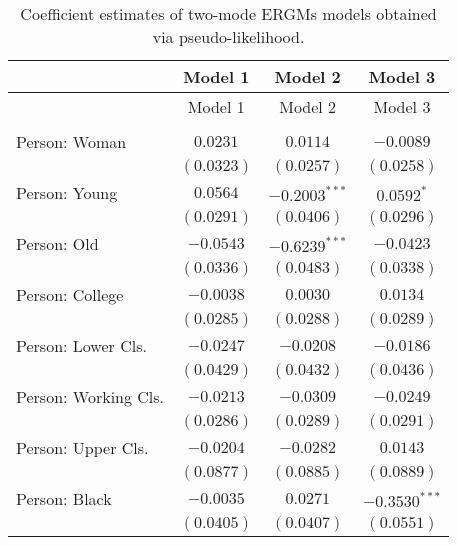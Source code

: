 
\begin{center}
\begin{longtable}{l c c c}
\caption{Coefficient estimates of two-mode ERGMs models obtained via pseudo-likelihood.}
\label{tab:reg2}\\
\toprule
 & Model 1 & Model 2 & Model 3 \\
\midrule
\endfirsthead
\toprule
 & Model 1 & Model 2 & Model 3 \\
\midrule
\endhead
\bottomrule
\endfoot
\bottomrule
\multicolumn{4}{l}{\scriptsize{$^{***}p<0.001$; $^{**}p<0.01$; $^{*}p<0.05$}}\\
\endlastfoot
Person: Woman              & $0.0231$       & $0.0114$        & $-0.0089$       \\
                           & $(0.0323)$     & $(0.0257)$      & $(0.0258)$      \\
Person: Young              & $0.0564$       & $-0.2003^{***}$ & $0.0592^{*}$    \\
                           & $(0.0291)$     & $(0.0406)$      & $(0.0296)$      \\
Person: Old                & $-0.0543$      & $-0.6239^{***}$ & $-0.0423$       \\
                           & $(0.0336)$     & $(0.0483)$      & $(0.0338)$      \\
Person: College            & $-0.0038$      & $0.0030$        & $0.0134$        \\
                           & $(0.0285)$     & $(0.0288)$      & $(0.0289)$      \\
Person: Lower Cls.         & $-0.0247$      & $-0.0208$       & $-0.0186$       \\
                           & $(0.0429)$     & $(0.0432)$      & $(0.0436)$      \\
Person: Working Cls.       & $-0.0213$      & $-0.0309$       & $-0.0249$       \\
                           & $(0.0286)$     & $(0.0289)$      & $(0.0291)$      \\
Person: Upper Cls.         & $-0.0204$      & $-0.0282$       & $0.0143$        \\
                           & $(0.0877)$     & $(0.0885)$      & $(0.0889)$      \\
Person: Black              & $-0.0035$      & $0.0271$        & $-0.3530^{***}$ \\
                           & $(0.0405)$     & $(0.0407)$      & $(0.0551)$      \\

\end{longtable}
\end{center}
